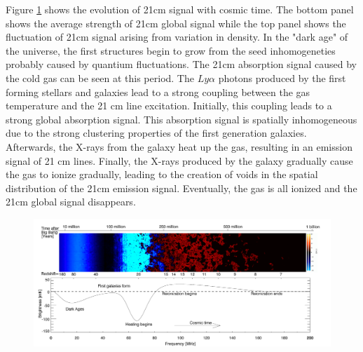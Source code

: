 \documentclass{article}
\begin{document}
Figure \ref{historyofHI} shows the evolution of 21cm signal with cosmic time. The bottom panel shows the average strength of 21cm global signal while the top panel shows the fluctuation of 21cm signal arising
from variation in density. In the "dark age" of the universe, the first structures begin to grow from the seed inhomogeneties probably caused by quantium 
fluctuations. The 21cm absorption signal caused by the cold gas can be seen at this period. The $Ly\alpha$ photons produced by the first forming stellars and galaxies lead to a strong coupling between the gas temperature and the 21 cm line excitation. Initially, this coupling leads to a strong global absorption signal. This absorption signal is spatially inhomogeneous due to the strong clustering properties of the first generation galaxies. Afterwards, the X-rays from the galaxy heat up the gas, resulting in an emission signal of 21 cm lines. Finally, the X-rays produced by the galaxy gradually cause the gas to ionize gradually, leading to the creation of voids in the spatial distribution of the 21cm emission signal. Eventually, the gas is all ionized and the 21cm global signal disappears.

\begin{figure}
    \centering
    \includegraphics[scale=0.3]{history1.png}
    \caption{}
    \label{historyofHI}
\end{figure}
\end{document}
